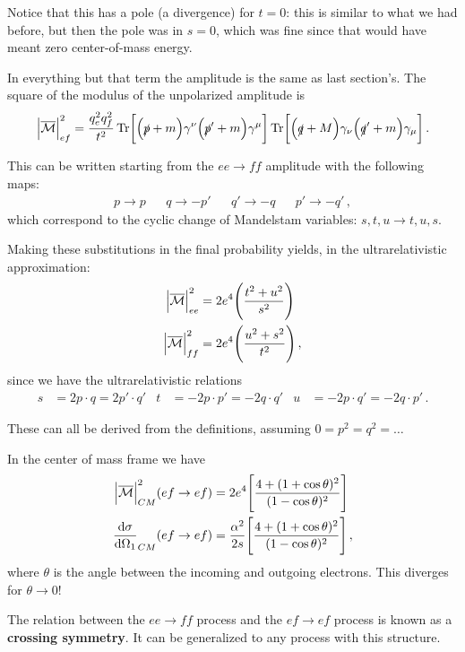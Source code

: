 \documentclass[main.tex]{subfiles}
\begin{document}
Notice that this has a pole (a divergence) for \(t = 0\): this is similar to what we had before, but then the pole was in \(s = 0\), which was fine since that would have meant zero center-of-mass energy. 

In everything but that term the amplitude is the same as last section's. The square of the modulus of the unpolarized amplitude is 
%
\begin{align}
\abs{\mathcal{\overline{M}}}^2_{ef} 
=\frac{q_e^2 q_f^2}{t^2} 
\Tr [\qty(\slashed{p} + m) \gamma^{\nu } \qty(\slashed{p}' + m) \gamma^{\mu }] 
\Tr [\qty(\slashed{q} + M) \gamma_{\nu } \qty(\slashed{q}' + m) \gamma_{\mu }] 
\,.
\end{align}

This can be written starting from the \(ee \to ff\) amplitude with the following maps: 
%
\begin{align}
p \to p 
&&
q \to -p'
&&
q' \to -q 
&&
p' \to -q'
\,,
\end{align}
%
which correspond to the cyclic change of Mandelstam variables: \(s, t, u \to t, u, s\). 

Making these substitutions in the final probability yields, in the ultrarelativistic approximation:
%
\begin{align}
\abs{\mathcal{\overline{M}}}^2_{ee} &= 2 e^{4} \qty(\frac{t^2+ u^2}{s^2}) \\
\abs{\mathcal{\overline{M}}}^2_{ff} &= 2 e^{4} \qty(\frac{u^2+ s^2}{t^2})
\,,
\end{align}
%
since we have the ultrarelativistic relations 
%
\begin{align}
s &= 2 p \cdot q = 2 p' \cdot q'  &
t &= -2 p \cdot p' = -2 q \cdot q' & 
u &= -2 p \cdot q' = -2 q \cdot p' 
\,.
\end{align}

These can all be derived from the definitions, assuming \(0=p^2= q^2=\dots\)

In the center of mass frame we have 
%
\begin{align}
\abs{\mathcal{\overline{M}}}^2_{CM} (ef \to ef) &= 2 e^{4} \qty[\frac{4 + (1 + \cos \theta )^2}{(1 - \cos \theta )^2}]  \\
\dv{\sigma }{\Omega_1 }_{CM}(ef \to ef) &= \frac{\alpha^2}{2s}
\qty[\frac{4 + (1 + \cos \theta )^2}{(1 - \cos \theta )^2}]
\,,
\end{align}
%
where \(\theta \) is the angle between the incoming and outgoing electrons. This diverges for \(\theta \to 0\)! 

The relation between the \(e e \to f f \) process and the \(ef \to ef\) process is known as a \textbf{crossing symmetry}. It can be generalized to any process with this structure.
\end{document}
